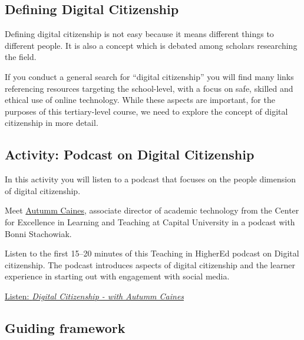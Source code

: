 \documentclass[
]{book}
\theoremstyle{definition}
\theoremstyle{definition}
\theoremstyle{definition}
\theoremstyle{definition}
\theoremstyle{remark}
\begin{document}
\hypertarget{defining-digital-citizenship}{%
\subsection*{Defining Digital Citizenship}\label{defining-digital-citizenship}}

Defining digital citizenship is not easy because it means different things to different people. It is also a concept which is debated among scholars researching the field.

If you conduct a general search for ``digital citizenship'' you will find many links referencing resources targeting the school-level, with a focus on safe, skilled and ethical use of online technology. While these aspects are important, for the purposes of this tertiary-level course, we need to explore the concept of digital citizenship in more detail.

\hypertarget{activity-podcast-on-digital-citizenship}{%
\subsection*{Activity: Podcast on Digital Citizenship}\label{activity-podcast-on-digital-citizenship}}

\begin{reflect}
In this activity you will listen to a podcast that focuses on the people dimension of digital citizenship.

Meet \href{http://autummcaines.com/}{Autumm Caines}, associate director of academic technology from the Center for Excellence in Learning and Teaching at Capital University in a podcast with Bonni Stachowiak.

Listen to the first 15--20 minutes of this Teaching in HigherEd podcast on Digital citizenship. The podcast introduces aspects of digital citizenship and the learner experience in starting out with engagement with social media.

\href{https://teachinginhighered.com/115}{Listen: \emph{Digital Citizenship - with Autumm Caines}}
\end{reflect}

\hypertarget{guiding-framework}{%
\subsection*{Guiding framework}\label{guiding-framework}}
\end{document}
